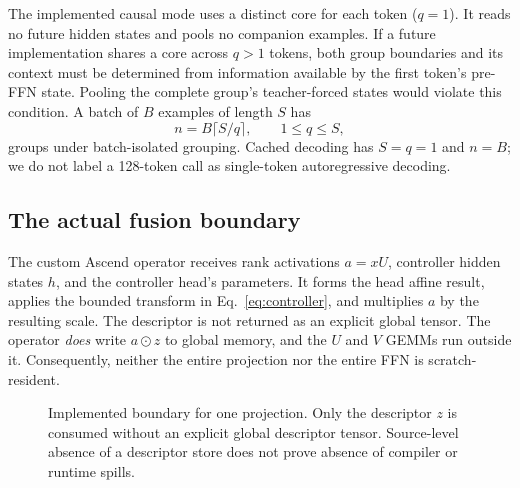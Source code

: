 The implemented causal mode uses a distinct core for each token ($q=1$).
It reads no future hidden states and pools no companion examples. If a future
implementation shares a core across $q>1$ tokens, both group boundaries and
its context must be determined from information available by the first token's
pre-FFN state. Pooling the complete group's teacher-forced states would violate
this condition. A batch of $B$ examples of length $S$ has
\begin{equation}
 n=B\lceil S/q\rceil,\qquad 1\le q\le S,\label{eq:groups}
\end{equation}
groups under batch-isolated grouping. Cached decoding has $S=q=1$ and $n=B$;
we do not label a 128-token call as single-token autoregressive decoding.

\subsection{The actual fusion boundary}
The custom Ascend operator receives rank activations $a=xU$, controller hidden
states $h$, and the controller head's parameters. It forms the head affine
result, applies the bounded transform in Eq.~\eqref{eq:controller}, and
multiplies $a$ by the resulting scale. The descriptor is not returned as an
explicit global tensor. The operator \emph{does} write $a\odot z$ to global
memory, and the $U$ and $V$ GEMMs run outside it. Consequently, neither the
entire projection nor the entire FFN is scratch-resident.

\begin{figure}[t]
\centering
{}
\caption{Implemented boundary for one projection. Only the descriptor $z$ is
consumed without an explicit global descriptor tensor. Source-level absence
of a descriptor store does not prove absence of compiler or runtime spills.}
\label{fig:boundary}
\end{figure}

